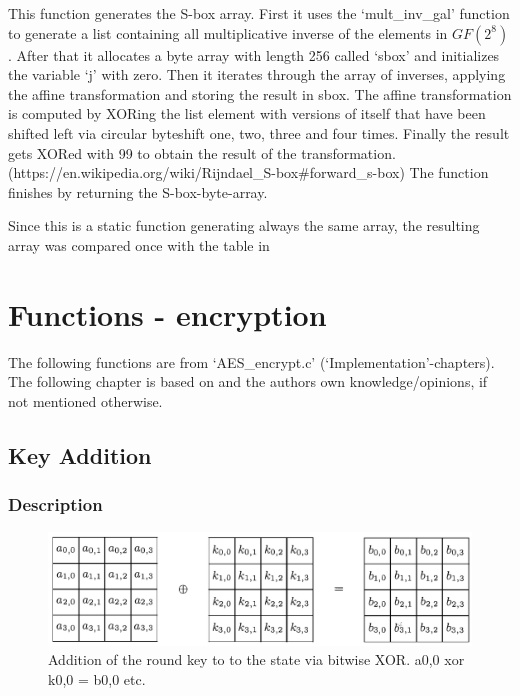 This function generates the S-box array. First it uses the
`mult\_inv\_gal' function to generate a list containing all
multiplicative inverse of the elements in $GF(2^{8})$. After that it
allocates a byte array with length 256 called `sbox' and initializes the
variable `j' with zero. Then it iterates through the array of inverses,
applying the affine transformation and storing the result in sbox. The
affine transformation is computed by XORing the list element with
versions of itself that have been shifted left via circular byteshift
one, two, three and four times. Finally the result gets XORed with 99 to
obtain the result of the transformation.
(https://en.wikipedia.org/wiki/Rijndael\_S-box\#forward\_s-box) The
function finishes by returning the S-box-byte-array.

Since this is a static function generating always the same array, the
resulting array was compared once with the table in \cite[Fig. 7]{fips197}

\hypertarget{functions---encryption}{%
\section{Functions - encryption}\label{functions---encryption}}

The following functions are from `AES\_encrypt.c'
(`Implementation'-chapters). The following chapter is based on \cite{fips197} and the authors own
knowledge/opinions, if not mentioned otherwise.

\hypertarget{key-addition}{%
\subsection{Key Addition}\label{key-addition}}

\hypertarget{description-2}{%
\subsubsection{Description}\label{description-2}}

\begin{figure}
\centering
\includegraphics[scale = 0.3]{data/figures/addroundkey.png} 
\caption{Addition of the round key to to the state via bitwise XOR. a0,0 xor k0,0 = b0,0 etc.}
\end{figure}


